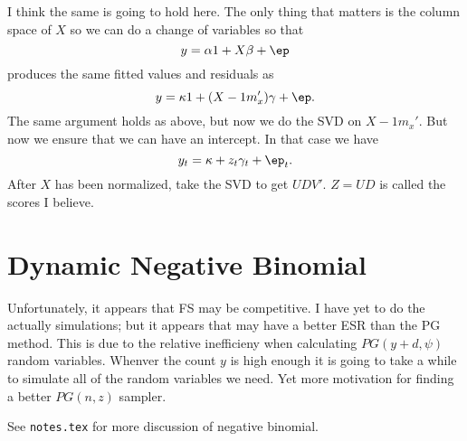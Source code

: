\documentclass{article}
\begin{document}
I think the same is going to hold here.  The only thing that matters is the
column space of $X$ so we can do a change of variables so that
\[
y = \alpha 1 + X \beta + \ep
\]
produces the same fitted values and residuals as
\[
y = \kappa 1 + (X - 1 m_x') \gamma + \ep.
\]
The same argument holds as above, but now we do the SVD on $X- 1 m_x'$.  But now
we ensure that we can have an intercept.  In that case we have
\[
y_t = \kappa + z_t \gamma_t + \ep_t.
\]
After $X$ has been normalized, take the SVD to get $UDV'$.  $Z=UD$ is called the
scores I believe.

\section{Dynamic Negative Binomial}

Unfortunately, it appears that FS may be competitive.  I have yet to do the
actually simulations; but it appears that \cite{fruhwirth-schnatter-etal-2009}
may have a better ESR than the PG method.  This is due to the relative
inefficieny when calculating $PG(y+d, \psi)$ random variables.  Whenver the
count $y$ is high enough it is going to take a while to simulate all of the
random variables we need.  Yet more motivation for finding a better $PG(n, z)$
sampler.

See \texttt{notes.tex} for more discussion of negative binomial.
\end{document}
